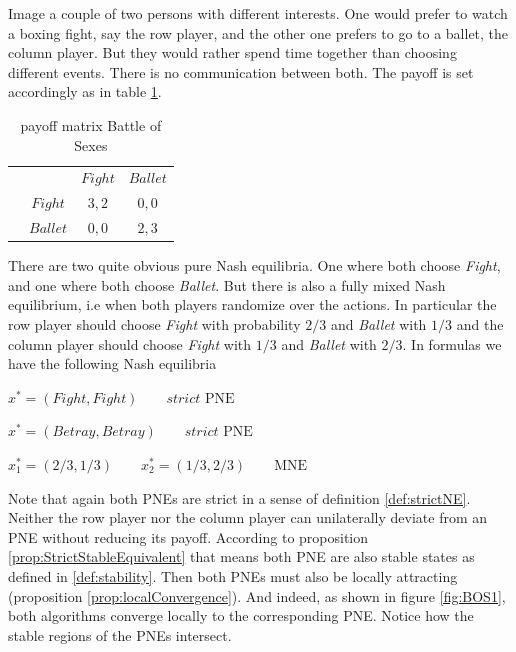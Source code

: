 Image a couple of two persons with different interests. One would prefer to watch a boxing fight, say the row player, and the other one prefers to go to a ballet, the column player. But they would rather spend time together than choosing different events. There is no communication between both. The payoff is set accordingly as in table \ref{tab:payoffBattleOfSexes}.

\begin{table}[H]\centering
\setlength{\extrarowheight}{2pt}
\begin{tabular}{cc|c|c|}
  & \multicolumn{1}{c}{} & \multicolumn{1}{c}{$Fight$}  & \multicolumn{1}{c}{$Ballet$} \\\cline{3-4}
  & $Fight$ & $3,2$ & $0,0$ \\\cline{3-4}
  & $Ballet$ & $0,0$ & $2,3$ \\\cline{3-4}
\end{tabular}\caption{\label{tab:payoffBattleOfSexes}payoff matrix Battle of Sexes}
\end{table}

There are two quite obvious pure Nash equilibria. One where both choose \textit{Fight}, and one where both choose \textit{Ballet}. But there is also a fully mixed Nash equilibrium, i.e when both players randomize over the actions. In particular the row player should choose \textit{Fight} with probability $2/3$ and \textit{Ballet} with $1/3$ and the column player should choose \textit{Fight} with $1/3$ and \textit{Ballet} with $2/3$. In formulas we have the following Nash equilibria

\begin{description}\centering
    \item $x^{*} = (Fight,Fight) \qquad \textit{strict }\text{PNE}$
    \item $x^{*} = (Betray,Betray) \qquad \textit{strict }\text{PNE}$
    \item $x_{1}^* = (2/3,1/3) \qquad x_{2}^* = (1/3,2/3) \qquad \text{MNE}$
\end{description}

Note that again both PNEs are strict in a sense of definition \ref{def:strictNE}. Neither the row player nor the column player can unilaterally deviate from an PNE without reducing its payoff. According to proposition \ref{prop:StrictStableEquivalent} that means both PNE are also stable states as defined in \ref{def:stability}. Then both PNEs must also be locally attracting (proposition \ref{prop:localConvergence}). And indeed, as shown in figure \ref{fig:BOS1}, both algorithms converge locally to the corresponding PNE. Notice how the stable regions of the PNEs intersect.

